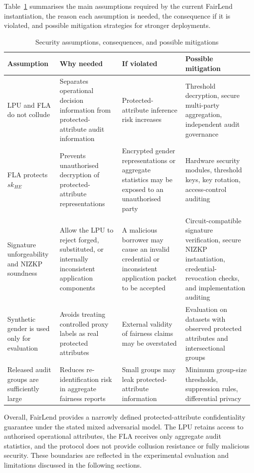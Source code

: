 \documentclass[a4paper,fleqn]{cas-dc}
\begin{document}
{Table~\ref{tab:security_assumptions} summarises the main assumptions required by the current FairLend instantiation, the reason each assumption is needed, the consequence if it is violated, and possible mitigation strategies for stronger deployments.

\begin{table}[htbp]
\centering
\caption{Security assumptions, consequences, and possible mitigations}
\label{tab:security_assumptions}
\scriptsize
\begin{tabular}{|p{3.0cm}|p{3.8cm}|p{3.8cm}|p{3.8cm}|}
\hline
\textbf{Assumption} & \textbf{Why needed} & \textbf{If violated} & \textbf{Possible mitigation} \\
\hline
LPU and FLA do not collude & Separates operational decision information from protected-attribute audit information & Protected-attribute inference risk increases & Threshold decryption, secure multi-party aggregation, independent audit governance \\

FLA protects $sk_{HE}$ & Prevents unauthorised decryption of protected-attribute representations & Encrypted gender representations or aggregate statistics may be exposed to an unauthorised party & Hardware security modules, threshold keys, key rotation, access-control auditing \\

Signature unforgeability and NIZKP soundness & Allow the LPU to reject forged, substituted, or internally inconsistent application components & A malicious borrower may cause an invalid credential or inconsistent application packet to be accepted & Circuit-compatible signature verification, secure NIZKP instantiation, credential-revocation checks, and implementation auditing \\

Synthetic gender is used only for evaluation & Avoids treating controlled proxy labels as real protected attributes & External validity of fairness claims may be overstated & Evaluation on datasets with observed protected attributes and intersectional groups \\
Released audit groups are sufficiently large & Reduces re-identification risk in aggregate fairness reports & Small groups may leak protected-attribute information & Minimum group-size thresholds, suppression rules, differential privacy \\
\hline
\end{tabular}
\end{table}

Overall, FairLend provides a narrowly defined protected-attribute confidentiality guarantee under the stated mixed adversarial model. The LPU retains access to authorised operational attributes, the FLA receives only aggregate audit statistics, and the protocol does not provide collusion resistance or fully malicious security. These boundaries are reflected in the experimental evaluation and limitations discussed in the following sections.

}
\end{document}
